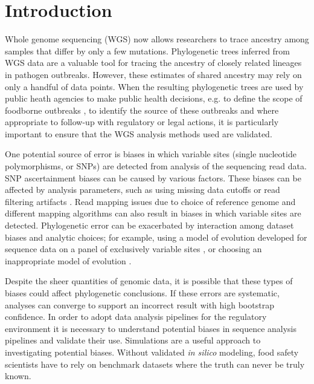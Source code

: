 \section*{Introduction}
Whole genome sequencing (WGS) now allows researchers to trace ancestry among samples that differ by only a few mutations.
Phylogenetic trees inferred from WGS data are a valuable tool for tracing the ancestry of closely related lineages in pathogen outbreaks.
However, these estimates of shared ancestry may rely on only a handful of data points.
When the resulting phylogenetic trees are used by public heath agencies to make public health decisions, e.g. to define the scope of foodborne outbreaks \citep{jackson_implementation_2016},
to identify the source of these outbreaks \citep{hoffmann_tracing_2015, dallman_phylogenetic_2016, allard_practical_2016} and where appropriate to follow-up with regulatory or legal actions, it is particularly important to ensure that the WGS analysis methods used are validated.

One potential source of error is biases in which variable sites (single nucleotide polymorphisms, or SNPs)
are detected from analysis of the sequencing read data. SNP ascertainment biases can be caused by various factors.
These biases can be affected by analysis parameters, such as using missing data cutoffs \citep{huang_unforeseen_2014} or read filtering artifacts \citep{li_toward_2014}.
Read mapping issues due to choice of reference genome \citep{bertels_automated_2014} and different mapping algorithms \citep{pightling_choice_2014} can also result in biases in which variable sites are detected.
Phylogenetic error can be exacerbated by interaction among dataset biases and analytic choices;
for example, using a model of evolution developed for sequence data on a panel of exclusively variable sites \citep{lewis_likelihood_2001}, or choosing an inappropriate model of evolution \citep{sullivan_are_1997}.

Despite the sheer quantities of genomic data, it is possible that these types of biases could affect phylogenetic conclusions.
If these errors are systematic, analyses can converge to support an incorrect result with high bootstrap confidence.
In order to adopt data analysis pipelines for the regulatory environment it is necessary to understand potential biases in sequence analysis pipelines and validate their use.
Simulations are a useful approach to investigating potential biases. 
Without validated \emph{in silico} modeling, food safety scientists have to rely on benchmark datasets where the truth can never be truly known.

